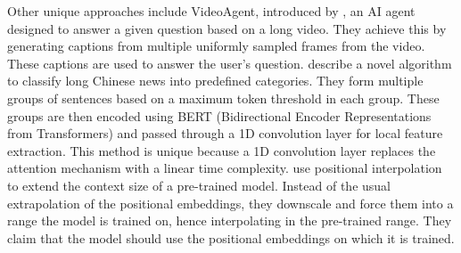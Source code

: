 Other unique approaches include VideoAgent, introduced by \citet{wang2024videoagent}, an AI agent designed to answer a given question based on a long video.
They achieve this by generating captions from multiple uniformly sampled frames from the video.
These captions are used to answer the user's question.
\citet{chen2022long} describe a novel algorithm to classify long Chinese news into predefined categories.
They form multiple groups of sentences based on a maximum token threshold in each group.
These groups are then encoded using BERT (Bidirectional Encoder Representations from Transformers) \cite{devlin2018bert} and passed through a 1D convolution layer for local feature extraction.
This method is unique because a 1D convolution layer replaces the attention mechanism with a linear time complexity.
\citet{chen2023extending} use positional interpolation to extend the context size of a pre-trained model.
Instead of the usual extrapolation of the positional embeddings, they downscale and force them into a range the model is trained on, hence interpolating in the pre-trained range.
They claim that the model should use the positional embeddings on which it is trained.
